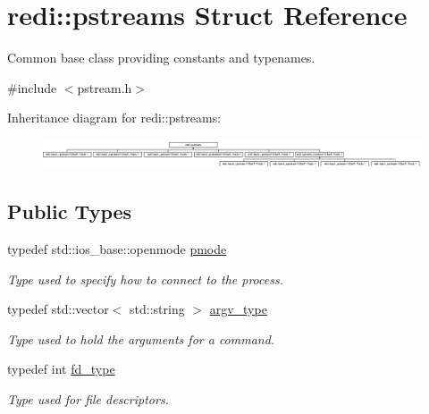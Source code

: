 \hypertarget{structredi_1_1pstreams}{}\section{redi\+:\+:pstreams Struct Reference}
\label{structredi_1_1pstreams}


Common base class providing constants and typenames.  




{\ttfamily \#include $<$pstream.\+h$>$}

Inheritance diagram for redi\+:\+:pstreams\+:\begin{figure}[H]
\begin{center}
\leavevmode
\includegraphics[height=0.853659cm]{structredi_1_1pstreams}
\end{center}
\end{figure}
\subsection*{Public Types}
\begin{DoxyCompactItemize}
\item 
\mbox{\label{structredi_1_1pstreams_a1eae4aad88812af03a0fbb3ec13c50b7}} 
typedef std\+::ios\+\_\+base\+::openmode \mbox{\hyperlink{structredi_1_1pstreams_a1eae4aad88812af03a0fbb3ec13c50b7}{pmode}}
\begin{DoxyCompactList}\small\item\em Type used to specify how to connect to the process. \end{DoxyCompactList}\item 
\mbox{\label{structredi_1_1pstreams_af902b894b095c1875e96c10129489467}} 
typedef std\+::vector$<$ std\+::string $>$ \mbox{\hyperlink{structredi_1_1pstreams_af902b894b095c1875e96c10129489467}{argv\+\_\+type}}
\begin{DoxyCompactList}\small\item\em Type used to hold the arguments for a command. \end{DoxyCompactList}\item 
\mbox{\label{structredi_1_1pstreams_add0b7eaed16eb6c22a56012958d85b1d}} 
typedef int \mbox{\hyperlink{structredi_1_1pstreams_add0b7eaed16eb6c22a56012958d85b1d}{fd\+\_\+type}}
\begin{DoxyCompactList}\small\item\em Type used for file descriptors. \end{DoxyCompactList}\end{DoxyCompactItemize}
